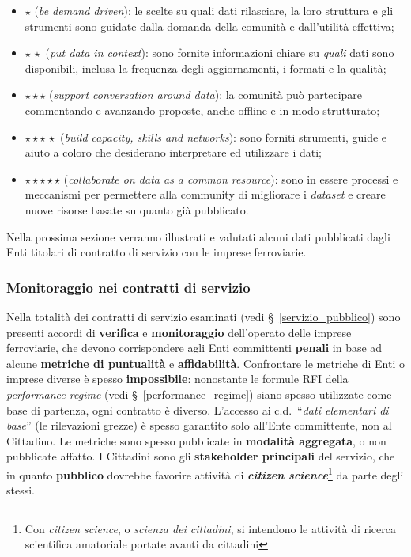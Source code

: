 \documentclass[12pt,a4paper,italian]{report}
\begin{document}
\begin{itemize}
    \item $\star$ (\textit{be demand driven}): le scelte su quali dati
    rilasciare, la loro struttura e gli strumenti sono guidate dalla
    domanda della comunità e dall'utilità effettiva;
    \item $\star\,\star$ (\textit{put data in context}): sono fornite
    informazioni chiare su \textit{quali} dati sono disponibili,
    inclusa la frequenza degli aggiornamenti, i formati e la qualità;
    \item $\star \star \star$ (\textit{support conversation around
        data}): la comunità può partecipare commentando e avanzando
    proposte, anche offline e in modo strutturato;
    \item $\star \star \star\,\star$ (\textit{build capacity, skills
        and networks}): sono forniti strumenti, guide e aiuto a coloro
    che desiderano interpretare ed utilizzare i dati;
    \item $\star \star \star \star \star$ (\textit{collaborate on data
        as a common resource}): sono in essere processi e meccanismi
    per permettere alla community di migliorare i \textit{dataset} e
    creare nuove risorse basate su quanto già pubblicato.
\end{itemize}

Nella prossima sezione verranno illustrati e valutati alcuni dati
pubblicati dagli Enti titolari di contratto di servizio con le imprese
ferroviarie.

\subsubsection{Monitoraggio nei contratti di servizio}

Nella totalità dei contratti di servizio esaminati (vedi
\S~\ref{servizio_pubblico}) sono presenti accordi di \textbf{verifica}
e \textbf{monitoraggio} dell'operato delle imprese ferroviarie, che
devono corrispondere agli Enti committenti \textbf{penali} in base ad
alcune \textbf{metriche di puntualità} e \textbf{affidabilità}.
Confrontare le metriche di Enti o imprese diverse è spesso
\textbf{impossibile}: nonostante le formule RFI della
\textit{performance regime} (vedi \S~\ref{performance_regime}) siano
spesso utilizzate come base di partenza, ogni contratto è diverso.
L'accesso ai c.d.\ ``\textit{dati elementari di base}'' (le
rilevazioni grezze) è spesso garantito solo all'Ente committente, non
al Cittadino.  Le metriche sono spesso pubblicate in \textbf{modalità
    aggregata}, o non pubblicate affatto.  I Cittadini sono gli
\textbf{stakeholder principali} del servizio, che in quanto
\textbf{pubblico} dovrebbe favorire attività di
\textbf{\textit{citizen science}}\footnote{Con \textit{citizen
        science}, o \textit{scienza dei cittadini}, si intendono le
    attività di ricerca scientifica amatoriale portate avanti da
    cittadini} da parte degli stessi.
\end{document}
